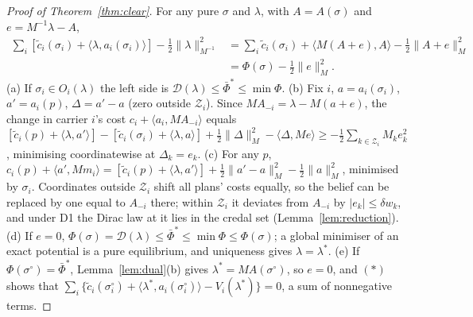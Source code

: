 \documentclass[preprint,11pt]{elsarticle}
\theoremstyle{definition}
\theoremstyle{remark}
\newcommand{\ip}[2]{\langle #1,#2\rangle}
\begin{document}
\begin{proof}[Proof of Theorem~\ref{thm:clear}]
For any pure $\sigma$ and $\lambda$, with $A=A(\sigma)$ and $e=M^{-1}\lambda-A$,
\begin{align*}
\textstyle\sum_i[\tilde c_i(\sigma_i)+\ip{\lambda}{a_i(\sigma_i)}]-\tfrac12\|\lambda\|^2_{M^{-1}}
&=\textstyle\sum_i\tilde c_i(\sigma_i)+\ip{M(A+e)}{A}-\tfrac12\|A+e\|_M^2\\
&=\Phi(\sigma)-\tfrac12\|e\|_M^2.\tag{$\ast$}
\end{align*}
(a) If $\sigma_i\in O_i(\lambda)$ the left side is $\mathcal D(\lambda)\le\bar\Phi^*\le\min\Phi$. (b) Fix $i$, $a=a_i(\sigma_i)$, $a'=a_i(p)$, $\Delta=a'-a$ (zero outside $\mathcal Z_i$). Since $MA_{-i}=\lambda-M(a+e)$, the change in carrier $i$'s cost $c_i+\ip{a_i}{MA_{-i}}$ equals $[\tilde c_i(p)+\ip{\lambda}{a'}]-[\tilde c_i(\sigma_i)+\ip{\lambda}{a}]+\tfrac12\|\Delta\|^2_M-\ip{\Delta}{Me}\ge-\tfrac12\sum_{k\in\mathcal Z_i}M_ke_k^2$, minimising coordinatewise at $\Delta_k=e_k$. (c) For any $p$, $c_i(p)+\ip{a'}{Mm_i}=[\tilde c_i(p)+\ip{\lambda}{a'}]+\tfrac12\|a'-a\|^2_M-\tfrac12\|a\|^2_M$, minimised by $\sigma_i$. Coordinates outside $\mathcal Z_i$ shift all plans' costs equally, so the belief can be replaced by one equal to $A_{-i}$ there; within $\mathcal Z_i$ it deviates from $A_{-i}$ by $|e_k|\le\delta w_k$, and under D1 the Dirac law at it lies in the credal set (Lemma~\ref{lem:reduction}). (d) If $e=0$, $\Phi(\sigma)=\mathcal D(\lambda)\le\bar\Phi^*\le\min\Phi\le\Phi(\sigma)$; a global minimiser of an exact potential is a pure equilibrium, and uniqueness gives $\lambda=\lambda^*$. (e) If $\Phi(\sigma^\circ)=\bar\Phi^*$, Lemma~\ref{lem:dual}(b) gives $\lambda^*=MA(\sigma^\circ)$, so $e=0$, and $(\ast)$ shows that $\sum_i\{\tilde c_i(\sigma^\circ_i)+\ip{\lambda^*}{a_i(\sigma^\circ_i)}-V_i(\lambda^*)\}=0$, a sum of nonnegative terms.
\end{proof}
\end{document}
